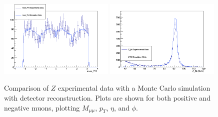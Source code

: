 \documentclass[a4paper]{article}
\begin{document}
\begin{figure}[bt]
\includegraphics[width=0.49\textwidth]{Measurement_mum_PHI.png}
\includegraphics[clip, trim = 0.5cm 0cm 1.7cm 1.3cm, width=0.49\textwidth]{Measurement_Z_M.png}
\vspace{-4mm}
\caption{\small Comparison of $Z$ experimental data with a Monte Carlo simulation with detector reconstruction. Plots are shown for both positive and negative muons, plotting $M_{\mu\mu}$, $p_T$, $\eta$, and $\phi$.}
\label{fig: Z histograms}
\end{figure}




\end{document}
